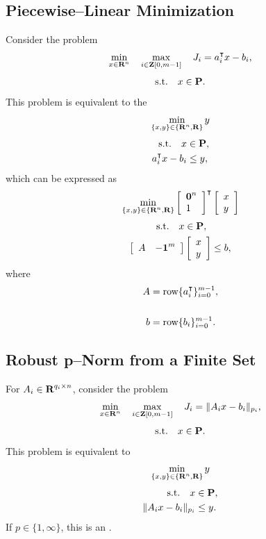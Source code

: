 \documentclass{article}
\begin{document}
    \clearpage
    \subsection{Piecewise--Linear Minimization}
        Consider the problem
        \begin{align*}
            \min_{x\in\textbf{R}^n}\quad \max_{i\in\textbf{Z}[0,m-1]} \quad J_i = a_i^\intercal x-b_i,
        \end{align*}
        \begin{align*}
            \text{s.t.}\quad x\in\textbf{P}.
        \end{align*}
        This problem is equivalent to the \LP \cite[p.~150]{bv_cvxbook}
        \begin{align*}
            \min_{\{x,y\}\in\{\textbf{R}^n,\textbf{R}\}} y
        \end{align*}
        \begin{align*}
            \text{s.t.}\quad x&\in\textbf{P},\\
            a_i^\intercal x-b_i &\leq y,
        \end{align*}
        which can be expressed as
        \begin{align*}
            \min_{\{x,y\}\in\{\textbf{R}^n,\textbf{R}\}} \left[\begin{array}{lllllllllllllllllll}\textbf{0}^n \\ 1\end{array}\right]^\intercal \left[\begin{array}{lllllllllllllllllll}x\\y\end{array}\right]
        \end{align*}
        \begin{align*}
            \text{s.t.}\quad x&\in\textbf{P},\\
            \left[\begin{array}{lllllllllllllllllll}A&-\textbf{1}^m\end{array}\right]&\left[\begin{array}{lllllllllllllllllll}x\\y\end{array}\right]\leq b,
        \end{align*}
        where
        \begin{align*}
            A &= \text{row}\{a_i^\intercal\}_{i=0}^{m-1},\\\\
            b &= \text{row}\{b_i\}_{i=0}^{m-1}.
        \end{align*}

\subsection{Robust p--Norm from a Finite Set}

        For $A_i\in\textbf{R}^{q_i\times n}$, consider the problem
        \begin{align*}
            \min_{x\in\textbf{R}^n}\quad \max_{i\in\textbf{Z}[0,m-1]} \quad J_i = \|A_ix-b_i\|_{p_i},
        \end{align*}
        \begin{align*}
            \text{s.t.}\quad x\in\textbf{P}.
        \end{align*}
        This problem is equivalent to \cite[p.~321]{bv_cvxbook}
        \begin{align*}
            \min_{\{x,y\}\in\{\textbf{R}^n,\textbf{R}\}} y
        \end{align*}
        \begin{align}
            \text{s.t.}\quad x&\in\textbf{P},\nonumber\\
            \|A_ix-b_i\|_{p_i}&\leq y.\label{eqn:robust}
        \end{align}
        If $p\in\{1,\infty\}$, this is an \LP.
\end{document}
